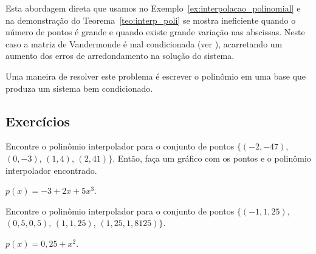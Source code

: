 
Esta abordagem direta que usamos no Exemplo~\ref{ex:interpolacao_polinomial} e na demonstração do Teorema~\ref{teo:interp_poli} se mostra ineficiente quando o número de pontos é grande e quando existe grande variação nas abscissas. Neste caso a matriz de Vandermonde é mal condicionada (ver \cite{Gautschi}), acarretando um aumento dos erros de arredondamento na solução do sistema.

Uma maneira de resolver este problema é escrever o polinômio em uma base que produza um sistema bem condicionado.

\subsection*{Exercícios}

\begin{Exercise}\label{exer:interp1}
Encontre o polinômio interpolador para o conjunto de pontos $\{(-2, -47)$, $(0, -3)$, $(1, 4)$, $(2, 41)\}$. Então, faça um gráfico com os pontos e o polinômio interpolador encontrado.
\end{Exercise}
\begin{Answer}
  \begin{tiny}
    $p(x) = -3 + 2x + 5x^3$.
  \end{tiny}
\end{Answer}

\begin{Exercise}
  Encontre o polinômio interpolador para o conjunto de pontos $\{(-1, 1,25)$, $(0,5, 0,5)$, $(1, 1,25)$, $(1,25, 1,8125)\}$.
\end{Exercise}
\begin{Answer}
  \begin{tiny}
    $p(x) = 0,25 + x^2$.
  \end{tiny}
\end{Answer}

